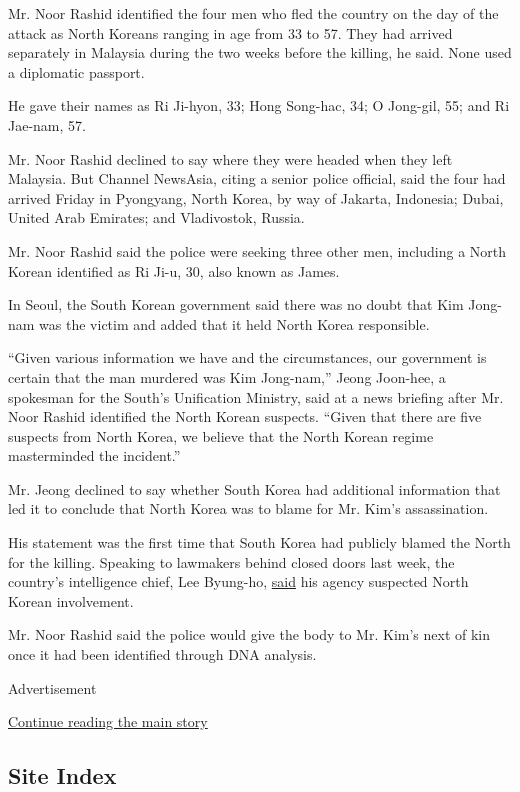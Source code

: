 Mr. Noor Rashid identified the four men who fled the country on the day
of the attack as North Koreans ranging in age from 33 to 57. They had
arrived separately in Malaysia during the two weeks before the killing,
he said. None used a diplomatic passport.

He gave their names as Ri Ji-hyon, 33; Hong Song-hac, 34; O Jong-gil,
55; and Ri Jae-nam, 57.

Mr. Noor Rashid declined to say where they were headed when they left
Malaysia. But Channel NewsAsia, citing a senior police official, said
the four had arrived Friday in Pyongyang, North Korea, by way of
Jakarta, Indonesia; Dubai, United Arab Emirates; and Vladivostok,
Russia.

Mr. Noor Rashid said the police were seeking three other men, including
a North Korean identified as Ri Ji-u, 30, also known as James.

In Seoul, the South Korean government said there was no doubt that Kim
Jong-nam was the victim and added that it held North Korea responsible.

``Given various information we have and the circumstances, our
government is certain that the man murdered was Kim Jong-nam,'' Jeong
Joon-hee, a spokesman for the South's Unification Ministry, said at a
news briefing after Mr. Noor Rashid identified the North Korean
suspects. ``Given that there are five suspects from North Korea, we
believe that the North Korean regime masterminded the incident.''

Mr. Jeong declined to say whether South Korea had additional information
that led it to conclude that North Korea was to blame for Mr. Kim's
assassination.

His statement was the first time that South Korea had publicly blamed
the North for the killing. Speaking to lawmakers behind closed doors
last week, the country's intelligence chief, Lee Byung-ho,
\href{https://www.nytimes3xbfgragh.onion/2017/02/15/world/asia/kim-jong-nam-assassination-north-korea.html}{said}
his agency suspected North Korean involvement.

Mr. Noor Rashid said the police would give the body to Mr. Kim's next of
kin once it had been identified through DNA analysis.

Advertisement

\protect\hyperlink{after-bottom}{Continue reading the main story}

\hypertarget{site-index}{%
\subsection{Site Index}\label{site-index}}

